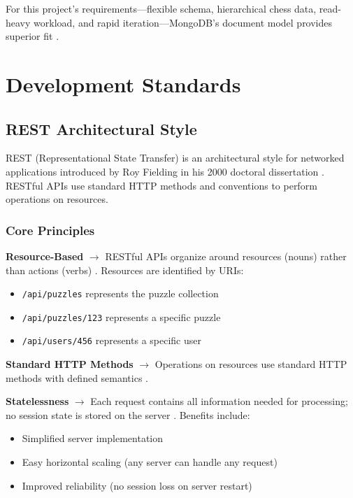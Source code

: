 For this project's requirements---flexible schema, hierarchical chess data, read-heavy workload, and rapid iteration---MongoDB's document model provides superior fit \cite{strauch2011nosql}.

\section{Development Standards}

\subsection*{REST Architectural Style}

REST (Representational State Transfer) is an architectural style for networked applications introduced by Roy Fielding in his 2000 doctoral dissertation \cite{fielding2000rest}. RESTful APIs use standard HTTP methods and conventions to perform operations on resources.

\subsubsection*{Core Principles}

\textbf{Resource-Based} $\rightarrow$ RESTful APIs organize around resources (nouns) rather than actions (verbs) \cite{rodriguez2008restful}. Resources are identified by URIs:
\begin{itemize}
    \item \texttt{/api/puzzles} represents the puzzle collection
    \item \texttt{/api/puzzles/123} represents a specific puzzle
    \item \texttt{/api/users/456} represents a specific user
\end{itemize}

\textbf{Standard HTTP Methods} $\rightarrow$ Operations on resources use standard HTTP methods with defined semantics \cite{fielding2014http}.

\textbf{Statelessness} $\rightarrow$ Each request contains all information needed for processing; no session state is stored on the server \cite{fielding2000rest}. Benefits include:
\begin{itemize}
    \item Simplified server implementation
    \item Easy horizontal scaling (any server can handle any request)
    \item Improved reliability (no session loss on server restart)
\end{itemize}

